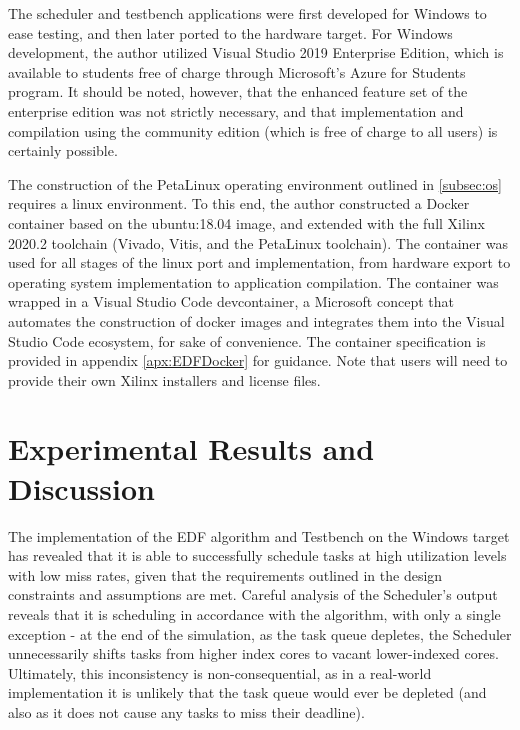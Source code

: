 The scheduler and testbench applications were first developed for Windows to ease testing, and then later ported to the hardware target. For Windows development, the author utilized Visual Studio 2019 Enterprise Edition, which is available to students free of charge through Microsoft's Azure for Students program. It should be noted, however, that the enhanced feature set of the enterprise edition was not strictly necessary, and that implementation and compilation using the community edition (which is free of charge to all users) is certainly possible.

The construction of the PetaLinux operating environment outlined in \ref{subsec:os} requires a linux environment. To this end, the author constructed a Docker container based on the ubuntu:18.04 image, and extended with the full Xilinx 2020.2 toolchain (Vivado, Vitis, and the PetaLinux toolchain). The container was used for all stages of the linux port and implementation, from hardware export to operating system implementation to application compilation. The container was wrapped in a Visual Studio Code devcontainer, a Microsoft concept that automates the construction of docker images and integrates them into the Visual Studio Code ecosystem, for sake of convenience. The container specification is provided in appendix \ref{apx:EDFDocker} for guidance. Note that users will need to provide their own Xilinx installers and license files.

\section{Experimental Results and Discussion}\label{sec:findings}
The implementation of the EDF algorithm and Testbench on the Windows target has revealed that it is able to successfully schedule tasks at high utilization levels with low miss rates, given that the requirements outlined in the design constraints and assumptions are met. Careful analysis of the Scheduler's output reveals that it is scheduling in accordance with the algorithm, with only a single exception - at the end of the simulation, as the task queue depletes, the Scheduler unnecessarily shifts tasks from higher index cores to vacant lower-indexed cores. Ultimately, this inconsistency is non-consequential, as in a real-world implementation it is unlikely that the task queue would ever be depleted (and also as it does not cause any tasks to miss their deadline).

